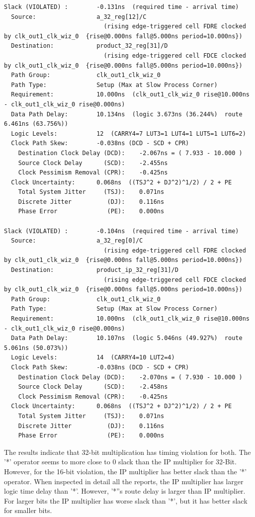 \documentclass{report}
\begin{document}
\begin{verbatim}
Slack (VIOLATED) :        -0.131ns  (required time - arrival time)
  Source:                 a_32_reg[12]/C
                            (rising edge-triggered cell FDRE clocked by clk_out1_clk_wiz_0  {rise@0.000ns fall@5.000ns period=10.000ns})
  Destination:            product_32_reg[31]/D
                            (rising edge-triggered cell FDCE clocked by clk_out1_clk_wiz_0  {rise@0.000ns fall@5.000ns period=10.000ns})
  Path Group:             clk_out1_clk_wiz_0
  Path Type:              Setup (Max at Slow Process Corner)
  Requirement:            10.000ns  (clk_out1_clk_wiz_0 rise@10.000ns - clk_out1_clk_wiz_0 rise@0.000ns)
  Data Path Delay:        10.134ns  (logic 3.673ns (36.244%)  route 6.461ns (63.756%))
  Logic Levels:           12  (CARRY4=7 LUT3=1 LUT4=1 LUT5=1 LUT6=2)
  Clock Path Skew:        -0.038ns (DCD - SCD + CPR)
    Destination Clock Delay (DCD):    -2.067ns = ( 7.933 - 10.000 ) 
    Source Clock Delay      (SCD):    -2.455ns
    Clock Pessimism Removal (CPR):    -0.425ns
  Clock Uncertainty:      0.068ns  ((TSJ^2 + DJ^2)^1/2) / 2 + PE
    Total System Jitter     (TSJ):    0.071ns
    Discrete Jitter          (DJ):    0.116ns
    Phase Error              (PE):    0.000ns

Slack (VIOLATED) :        -0.104ns  (required time - arrival time)
  Source:                 a_32_reg[0]/C
                            (rising edge-triggered cell FDRE clocked by clk_out1_clk_wiz_0  {rise@0.000ns fall@5.000ns period=10.000ns})
  Destination:            product_ip_32_reg[31]/D
                            (rising edge-triggered cell FDCE clocked by clk_out1_clk_wiz_0  {rise@0.000ns fall@5.000ns period=10.000ns})
  Path Group:             clk_out1_clk_wiz_0
  Path Type:              Setup (Max at Slow Process Corner)
  Requirement:            10.000ns  (clk_out1_clk_wiz_0 rise@10.000ns - clk_out1_clk_wiz_0 rise@0.000ns)
  Data Path Delay:        10.107ns  (logic 5.046ns (49.927%)  route 5.061ns (50.073%))
  Logic Levels:           14  (CARRY4=10 LUT2=4)
  Clock Path Skew:        -0.038ns (DCD - SCD + CPR)
    Destination Clock Delay (DCD):    -2.070ns = ( 7.930 - 10.000 ) 
    Source Clock Delay      (SCD):    -2.458ns
    Clock Pessimism Removal (CPR):    -0.425ns
  Clock Uncertainty:      0.068ns  ((TSJ^2 + DJ^2)^1/2) / 2 + PE
    Total System Jitter     (TSJ):    0.071ns
    Discrete Jitter          (DJ):    0.116ns
    Phase Error              (PE):    0.000ns

\end{verbatim}

The results indicate that 32-bit multiplication has timing violation for both. The '*' operator seems to more close to 0 slack than the IP multiplier for 32-Bit.
However, for the 16-bit violation, the IP multiplier has better slack than the '*' operator. When inspected in detail all the reports, the IP multiplier has larger logic time delay than '*'. However, '*''s route delay is larger than IP multiplier. For larger bits the IP multiplier has worse slack than '*', but it has better slack for smaller bits.
\end{document}
